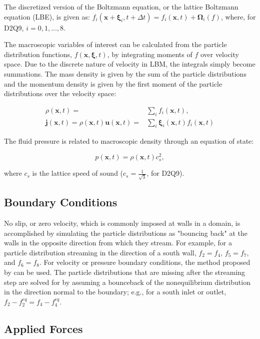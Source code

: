 \documentclass{article}
\newcommand{\pos}{\mathbf{x}}
\newcommand{\pvel}{\boldsymbol{\xi}}
\newcommand{\mvel}{\mathbf{u}}
\newcommand{\colop}{\boldsymbol{\Omega}}
\newcommand{\mmom}{\mathbf{j}}
\begin{document}
The discretized version of the Boltzmann equation, or the lattice Boltzmann equation (LBE), is given as: $f_i(\pos + \pvel_i, t + \Delta t) = f_i(\pos, t) + \colop_i(f)$, where, for D2Q9, $i = 0, 1, ..., 8$.

The macroscopic variables of interest can be calculated from the particle distribution functions, $f(\pos, \pvel, t)$, by integrating moments of $f$ over velocity space.
Due to the discrete nature of velocity in LBM, the integrals simply become summations.
The mass density is given by the sum of the particle distributions and the momentum density is given by the first moment of the particle distributions over the velocity space:

\begin{align}
\label{eq:rho} \rho(\pos, t) =& \sum_{i} f_i(\pos, t), \\
\label{eq:mom} \mmom(\pos, t) = \rho(\pos, t) \mvel(\pos, t) =& \sum_{i} \pvel_i(\pos, t) f_i(\pos, t)
\end{align}

The fluid pressure is related to macroscopic density through an equation of state:

\begin{equation}
\label{eq:pres} p(\pos, t) = \rho(\pos, t) c_s^2,
\end{equation}

\noindent where $c_s$ is the lattice speed of sound ($c_s = \frac{1}{\sqrt{3}}$, for D2Q9).

\subsection{Boundary Conditions}

No slip, or zero velocity, which is commonly imposed at walls in a domain, is accomplished by simulating the particle distributions as "bouncing back" at the walls in the opposite direction from which they stream.
For example, for a particle distribution streaming in the direction of a south wall, $f_2 = f_4$, $f_5 = f_7$, and $f_6 = f_8$.
For velocity or pressure boundary conditions, the method proposed by \citet{zou1997pressure} can be used.
The particle distributions that are missing after the streaming step are solved for by assuming a bounceback of the nonequilibrium distribution in the direction normal to the boundary; e.g., for a south inlet or outlet, $f_2 - f_2^{eq} = f_4 - f_4^{eq}$.

\subsection{Applied Forces}
\end{document}
